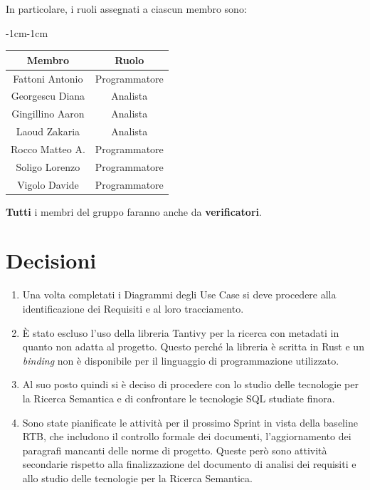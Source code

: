 \documentclass[a4paper,12pt]{article}
\begin{document}
In particolare, i ruoli assegnati a ciascun membro sono:
\begin{table}[H]
    \begin{adjustwidth}{-1cm}{-1cm}
    \centering
\begin{tabular}{|c|c|}
    \hline
    \textbf{Membro} & \textbf{Ruolo} \\
    \hline
    Fattoni Antonio & Programmatore \\
    \hline
    Georgescu Diana & Analista \\
    \hline
    Gingillino Aaron & Analista \\
    \hline
    Laoud Zakaria & Analista \\
    \hline
    Rocco Matteo A. & Programmatore \\
    \hline
    Soligo Lorenzo & Programmatore \\
    \hline
    Vigolo Davide & Programmatore \\
    \hline
\end{tabular}
    \end{adjustwidth}
\end{table}
\textbf{Tutti} i membri del gruppo faranno anche da \textbf{verificatori}.\\


\section{Decisioni}
\begin{enumerate}[noitemsep]
    \item Una volta completati i Diagrammi degli Use Case si deve procedere alla identificazione dei Requisiti e al loro tracciamento.
    \item È stato escluso l'uso della libreria Tantivy per la ricerca con metadati in quanto non adatta al progetto. Questo perché la libreria è scritta in Rust e un \textit{binding} non è disponibile per il linguaggio di programmazione utilizzato.
    \item Al suo posto quindi si è deciso di procedere con lo studio delle tecnologie per la Ricerca Semantica e di confrontare le tecnologie SQL studiate finora.
    \item Sono state pianificate le attività per il prossimo Sprint in vista della baseline RTB, che includono il controllo formale dei documenti, l'aggiornamento dei paragrafi mancanti delle norme di progetto. Queste però sono attività secondarie rispetto alla finalizzazione del documento di analisi dei requisiti e allo studio delle tecnologie per la Ricerca Semantica.
\end{enumerate}
\end{document}
